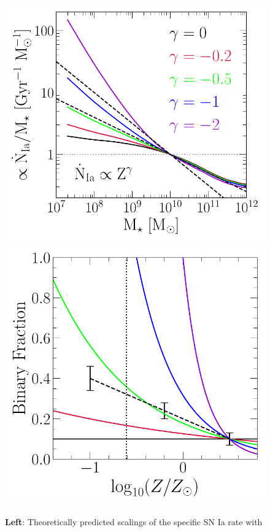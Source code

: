 \documentclass[ms.tex]{subfiles}
\begin{document}
\begin{figure}
\centering
\includegraphics[scale = 0.55]{umachine_iarate_metdep.pdf}
\includegraphics[scale = 0.56]{binaries_zscaling.pdf}
\caption{
\textbf{Left}: Theoretically predicted scalings of the specific SN Ia rate with
}
\end{figure}
\end{document}
